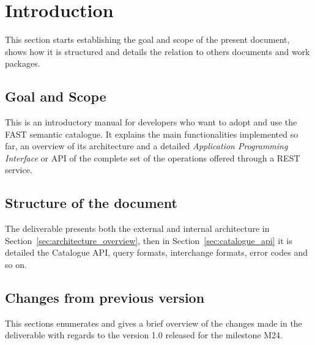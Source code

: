\documentclass{fast_latex}
\begin{document}
\clearpage
\section{Introduction} %
\label{sec:introduction}
This section starts establishing the goal and scope of the present document, shows how it is structured and details the relation to others documents and work packages.

\subsection{Goal and Scope} %
\label{sub:goal_and_scope}

This is an introductory manual for developers who want to adopt and use the FAST semantic catalogue. It explains the main functionalities implemented so far, an overview of its architecture and a detailed \emph{Application Programming Interface} or API of the complete set of the operations offered through a REST service.


\subsection{Structure of the document} %
\label{sub:structure_of_the_document}

The deliverable presents both the external and internal architecture in Section~\ref{sec:architecture_overview}, then in Section~\ref{sec:catalogue_api} it is detailed the Catalogue API, query formats, interchange formats, error codes and so on.


\subsection{Changes from previous version} %
\label{sub:changes_from_previous_version}

This sections enumerates and gives a brief overview of the changes made in the deliverable with regards to the version 1.0 released for the milestone M24.
\end{document}
